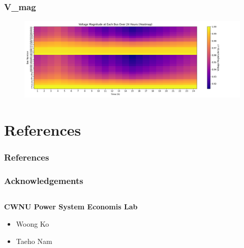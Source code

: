 \documentclass[
	11pt, %
	aspectratio=169, %
]{beamer}
\begin{document}
\begin{frame}
	\frametitle{V\_mag}

	\begin{figure}
		\includegraphics[width=5 in,keepaspectratio]{../fig/V_mag_heatmap.png}
	\end{figure}

	
\end{frame}

\section{References}


\begin{frame} %
	\frametitle{References}
	
	\printbibliography
	
	
\end{frame}



\begin{frame}
	\frametitle{Acknowledgements}
	
	\begin{columns}[t] %
		\begin{column}{0.45\textwidth} %
			\textbf{CWNU Power System Economis Lab}
			\begin{itemize}
				\item Woong Ko
				\item Taeho Nam
			\end{itemize}
			
		\end{column}		
		
	\end{columns}
\end{frame}
\end{document}
